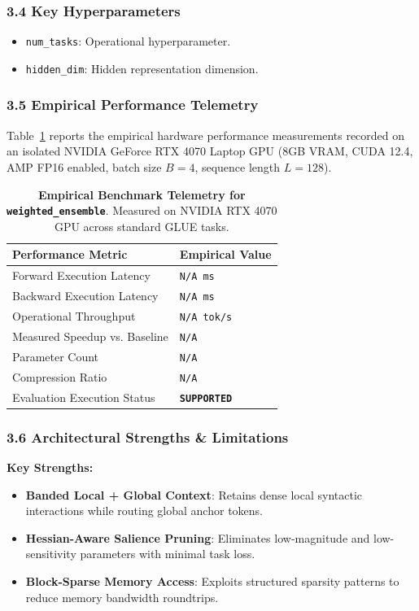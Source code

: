 \subsubsection*{3.4 Key Hyperparameters}
\begin{itemize}
    \item \texttt{num\_tasks}: Operational hyperparameter.
    \item \texttt{hidden\_dim}: Hidden representation dimension.
\end{itemize}

\subsubsection*{3.5 Empirical Performance Telemetry}
Table~\ref{tab:telemetry_weighted_ensemble} reports the empirical hardware performance measurements recorded on an isolated NVIDIA GeForce RTX 4070 Laptop GPU (8GB VRAM, CUDA 12.4, AMP FP16 enabled, batch size $B=4$, sequence length $L=128$).

\begin{table}[h]
\centering
\small
\caption{\textbf{Empirical Benchmark Telemetry for \texttt{weighted\_ensemble}}. Measured on NVIDIA RTX 4070 GPU across standard GLUE tasks.}
\label{tab:telemetry_weighted_ensemble}
\begin{tabularx}{\columnwidth}{lX}
\toprule
\textbf{Performance Metric} & \textbf{Empirical Value} \\
\midrule
Forward Execution Latency & \texttt{N/A ms} \\
Backward Execution Latency & \texttt{N/A ms} \\
Operational Throughput & \texttt{N/A tok/s} \\
Measured Speedup vs. Baseline & \texttt{N/A} \\
Parameter Count & \texttt{N/A} \\
Compression Ratio & \texttt{N/A} \\
Evaluation Execution Status & \textbf{\texttt{SUPPORTED}} \\
\bottomrule
\end{tabularx}
\end{table}

\subsubsection*{3.6 Architectural Strengths \& Limitations}
\textbf{Key Strengths:}
\begin{itemize}
    \item \textbf{Banded Local + Global Context}: Retains dense local syntactic interactions while routing global anchor tokens.
    \item \textbf{Hessian-Aware Salience Pruning}: Eliminates low-magnitude and low-sensitivity parameters with minimal task loss.
    \item \textbf{Block-Sparse Memory Access}: Exploits structured sparsity patterns to reduce memory bandwidth roundtrips.
\end{itemize}

